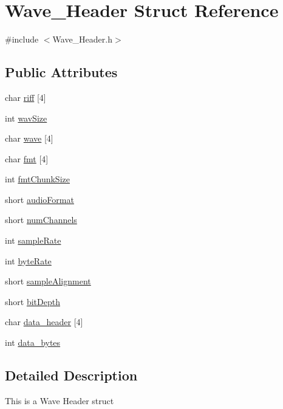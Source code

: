 \hypertarget{structWave__Header}{}\section{Wave\+\_\+\+Header Struct Reference}
\label{structWave__Header}


{\ttfamily \#include $<$Wave\+\_\+\+Header.\+h$>$}

\subsection*{Public Attributes}
\begin{DoxyCompactItemize}
\item 
char \hyperlink{structWave__Header_ac90ed5a284cbf30b3f69ea082de3a0c6}{riff} \mbox{[}4\mbox{]}
\item 
int \hyperlink{structWave__Header_a6928c2d8b8904339ebb788eb8290f142}{wav\+Size}
\item 
char \hyperlink{structWave__Header_a0619c4f802e42c1f0df93f77eab026b3}{wave} \mbox{[}4\mbox{]}
\item 
char \hyperlink{structWave__Header_a14d810235149a0b8bfab223852e1d414}{fmt} \mbox{[}4\mbox{]}
\item 
int \hyperlink{structWave__Header_a6b4c3112066ec18881997ca2f42b9c53}{fmt\+Chunk\+Size}
\item 
short \hyperlink{structWave__Header_a78581f9b4fa8ccd937260f6acd1805e4}{audio\+Format}
\item 
short \hyperlink{structWave__Header_a06db23d3c3ae3e20dca44ec8e1b62210}{num\+Channels}
\item 
int \hyperlink{structWave__Header_ab5fb0a7055f8ea82df946d215bc803ee}{sample\+Rate}
\item 
int \hyperlink{structWave__Header_ad060843c06006ec4158afc8dccea9fc3}{byte\+Rate}
\item 
short \hyperlink{structWave__Header_aa9440351df7a8f57a5536fea94958c56}{sample\+Alignment}
\item 
short \hyperlink{structWave__Header_a84a83027dfbce3d40ef313e2e51fb14c}{bit\+Depth}
\item 
char \hyperlink{structWave__Header_a4e2bc40c58a9da8bbe53b14e9f822153}{data\+\_\+header} \mbox{[}4\mbox{]}
\item 
int \hyperlink{structWave__Header_a30a52cd01475ca214d183dfb1d6c4230}{data\+\_\+bytes}
\end{DoxyCompactItemize}


\subsection{Detailed Description}
This is a Wave Header struct 

